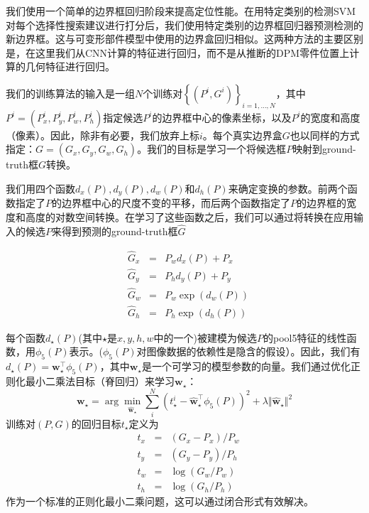\documentclass[../main.tex]{subfile}
\begin{document}
我们使用一个简单的边界框回归阶段来提高定位性能。在用特定类别的检测SVM对每个选择性搜索建议进行打分后，我们使用特定类别的边界框回归器预测检测的新边界框。这与可变形部件模型\cite{dpm}中使用的边界盒回归相似。这两种方法的主要区别是，在这里我们从CNN计算的特征进行回归，而不是从推断的DPM零件位置上计算的几何特征进行回归。

我们的训练算法的输入是一组$N$个训练对$\left\{ \left( P^i, G^i \right) \right\}_{i=1,\ldots, N}$，其中$P^i = \left( P_x^i, P_y^i, P_w^i, P_h^i \right)$指定候选$P^i$的边界框中心的像素坐标，以及$P^i$的宽度和高度（像素）。因此，除非有必要，我们放弃上标$i$。每个真实边界盒$G$也以同样的方式指定：$G=\left( G_x, G_y, G_w, G_h \right)$。我们的目标是学习一个将候选框$P$映射到ground-truth框$G$转换。

我们用四个函数$d_x\left( P \right), d_y\left( P \right), d_w\left( P \right)$和$d_h\left( P \right)$来确定变换的参数。前两个函数指定了$P$的边界框中心的尺度不变的平移，而后两个函数指定了$P$的边界框的宽度和高度的对数空间转换。在学习了这些函数之后，我们可以通过将转换在应用输入的候选$P$来得到预测的ground-truth框$\hat{G}$

\begin{equation*}
    \begin{aligned}
         & \hat{G}_x & = & P_{w}d_{x}\left(P\right) + P_x          \\
         & \hat{G}_y & = & P_{h}d_{y}\left(P\right) + P_y          \\
         & \hat{G}_w & = & P_{w}\exp\left(d_w\left(P\right)\right) \\
         & \hat{G}_h & = & P_{h}\exp\left(d_h\left(P\right)\right)
    \end{aligned}
\end{equation*}

每个函数$d_\star \left(P\right)$(其中$\star$是$x, y, h, w$中的一个)被建模为候选$P$的pool5特征的线性函数，用$\phi_5\left(P\right)$表示。($\phi_5\left(P\right)$对图像数据的依赖性是隐含的假设）。因此，我们有$d_\star \left(P\right) = \mathbf{w}_\star^\top \phi_5\left(P\right)$，其中$\mathbf{w}_\star$是一个可学习的模型参数的向量。我们通过优化正则化最小二乘法目标（脊回归）来学习$\mathbf{w}_\star$：
\begin{equation*}
    \mathbf{w}_\star = \arg\min_{\hat{\mathbf{w}}_\star}\sum_i^N\left( t_\star^i - \hat{\mathbf{w}}_\star^\top \phi_5\left (P\right) \right)^2 + \lambda\Vert \hat{\mathbf{w}}_\star \Vert^2
\end{equation*}
训练对$\left( P, G \right)$的回归目标$t_\star$定义为
\begin{equation*}
    \begin{aligned}
         & t_x & = & \left( G_x - P_x \right) / P_w \\
         & t_y & = & \left( G_y - P_y \right) / P_h \\
         & t_w & = & \log\left( G_w / P_w \right)   \\
         & t_h & = & \log\left( G_h / P_h \right)
    \end{aligned}
\end{equation*}
作为一个标准的正则化最小二乘问题，这可以通过闭合形式有效解决。
\end{document}
